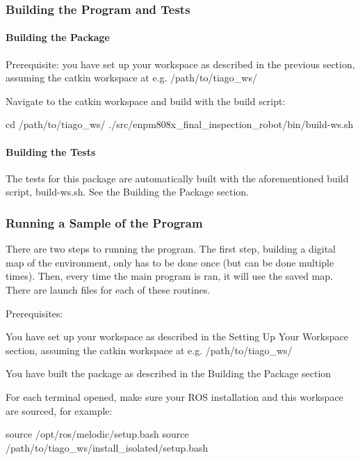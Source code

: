 \subsubsection*{Building the Program and Tests}

\paragraph*{Building the Package}


\begin{DoxyItemize}
\item Prerequisite\+: you have set up your workspace as described in the previous section, assuming the catkin workspace at e.\+g. /path/to/tiago\+\_\+ws/
\item Navigate to the catkin workspace and build with the build script\+: 
\begin{DoxyCode}
cd /path/to/tiago\_ws/
./src/enpm808x\_final\_inspection\_robot/bin/build-ws.sh
\end{DoxyCode}

\end{DoxyItemize}

\paragraph*{Building the Tests}

The tests for this package are automatically built with the aforementioned build script, build-\/ws.\+sh. See the \textquotesingle{}Building the Package\textquotesingle{} section.

\subsubsection*{Running a Sample of the Program}

There are two steps to running the program. The first step, building a digital map of the environment, only has to be done once (but can be done multiple times). Then, every time the \textquotesingle{}main\textquotesingle{} program is ran, it will use the saved map. There are launch files for each of these routines.


\begin{DoxyItemize}
\item Prerequisites\+:
\begin{DoxyItemize}
\item You have set up your workspace as described in the \textquotesingle{}Setting Up Your Workspace\textquotesingle{} section, assuming the catkin workspace at e.\+g. /path/to/tiago\+\_\+ws/
\item You have built the package as described in the \textquotesingle{}Building the Package\textquotesingle{} section
\end{DoxyItemize}
\item For each terminal opened, make sure your R\+OS installation and this workspace are sourced, for example\+: 
\begin{DoxyCode}
source /opt/ros/melodic/setup.bash
source /path/to/tiago\_ws/install\_isolated/setup.bash
\end{DoxyCode}

\end{DoxyItemize}

